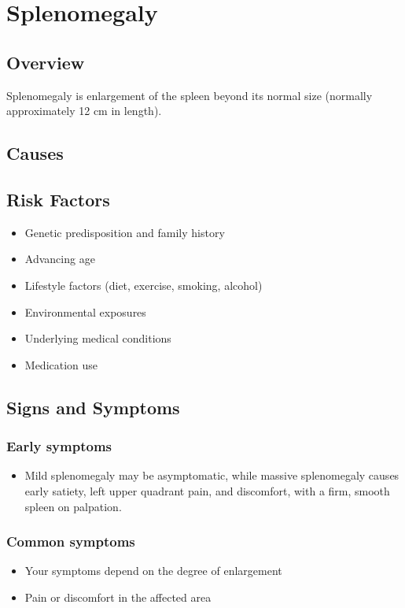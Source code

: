 \chapter{Splenomegaly}
\label{sec:Splenomegaly}

\section{Overview}
Splenomegaly is enlargement of the spleen beyond its normal size (normally approximately 12 cm in length).
\section{Causes}
\section{Risk Factors}

\begin{itemize}[noitemsep]
  \item Genetic predisposition and family history
  \item Advancing age
  \item Lifestyle factors (diet, exercise, smoking, alcohol)
  \item Environmental exposures
  \item Underlying medical conditions
  \item Medication use
\end{itemize}
\section{Signs and Symptoms}

\subsection{Early symptoms}
\begin{itemize}[noitemsep]
  \item Mild splenomegaly may be asymptomatic, while massive splenomegaly causes early satiety, left upper quadrant pain, and discomfort, with a firm, smooth spleen on palpation.
\end{itemize}

\subsection{Common symptoms}
\begin{itemize}[noitemsep]
  \item Your symptoms depend on the degree of enlargement

  \item Pain or discomfort in the affected area
  \end{itemize}

